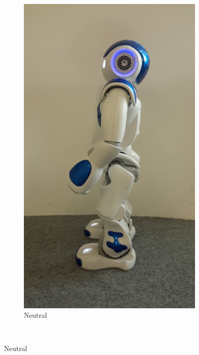 \begin{figure}[h!]
        \centering        
        \begin{subfigure}[b]{0.18\textwidth}
                \includegraphics[width=\textwidth]{figures/neutral.jpg}
                \caption{Neutral}
                \label{fig:neutral}
        \end{subfigure}
        ~ %

\end{figure}

